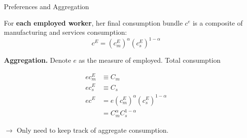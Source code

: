 \documentclass[9pt,xcolor={svgnames}]{beamer}
\begin{document}
\begin{frame}{Preferences and Aggregation} \label{app:proof}



  For \textbf{each employed worker}, her final consumption bundle $c^e$ is a composite of manufacturing and services consumption:
\begin{equation*}
    c^E = (c^E_m)^{\alpha} (c^E_s)^{1-\alpha}
    \label{eq:ce}
\end{equation*}



\textbf{Aggregation.} Denote $e$ as the measure of employed. Total consumption 

\begin{align*}
     e c_m^E & \equiv C_m \\
     e c_s^E &\equiv C_s \\
    ec^E &= e   (c^E_m)^{\alpha} (c^E_s)^{1-\alpha}\\
     & =  C_m^{\alpha} C_s^{1-\alpha}
\end{align*}

$\rightarrow $  Only need to keep track of aggregate consumption. 

  \hyperlink{main:preference}{}
\end{frame}
\end{document}
